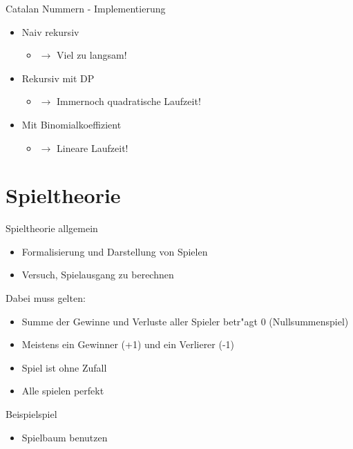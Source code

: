 \documentclass[18pt]{beamer}
\begin{document}
\begin{frame}{Catalan Nummern - Implementierung}
\begin{itemize}
\item Naiv rekursiv
\begin{itemize}
\item $\rightarrow$ Viel zu langsam! 
\end{itemize}
\item Rekursiv mit DP
\begin{itemize}
\item $\rightarrow$ Immernoch quadratische Laufzeit!
\end{itemize}
\item Mit Binomialkoeffizient
\begin{itemize}
\item $\rightarrow$ Lineare Laufzeit!
\end{itemize}
\end{itemize}
\end{frame}




\section{Spieltheorie}
\begin{frame}{Spieltheorie allgemein}
\begin{itemize}
\item Formalisierung und Darstellung von Spielen
\item Versuch, Spielausgang zu berechnen
\end{itemize}
Dabei muss gelten:
\begin{itemize}
\item Summe der Gewinne und Verluste aller Spieler betr"agt 0 (Nullsummenspiel)
\item Meistens ein Gewinner (+1) und ein Verlierer (-1)
\item Spiel ist ohne Zufall
\item Alle spielen perfekt
\end{itemize}
\end{frame}

\begin{frame}{Beispielspiel}
\begin{itemize}
\begin{block}{simples Beispielspiel}
Alice und Bob haben sechs M"unzen in der Mitte liegen und nehmen abwechselnd je eine bis drei davon. Wer die letzte M"unze nimmt, gewinnt.
\end{block}
\item Spielbaum benutzen
\end{itemize}
\end{frame}
\end{document}

